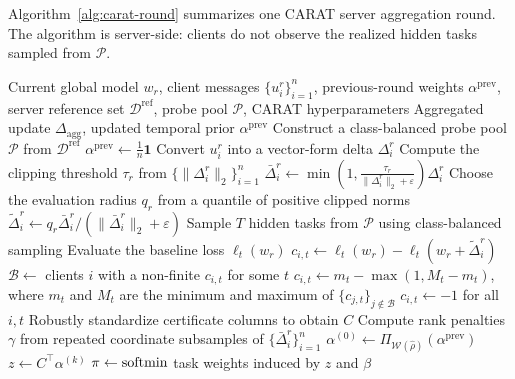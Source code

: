 Algorithm~\ref{alg:carat-round} summarizes one CARAT server aggregation round. The algorithm is server-side: clients do not observe the realized hidden tasks sampled from $\mathcal{P}$.

\begin{algorithm}[t]
\caption{CARAT server aggregation at round $r$}
\label{alg:carat-round}
\begin{algorithmic}[1]
\REQUIRE Current global model $w_r$, client messages $\{u_i^r\}_{i=1}^n$, previous-round weights $\alpha^{\mathrm{prev}}$, server reference set $\mathcal{D}^{\mathrm{ref}}$, probe pool $\mathcal{P}$, CARAT hyperparameters
\ENSURE Aggregated update $\Delta_{\mathrm{agg}}$, updated temporal prior $\alpha^{\mathrm{prev}}$
    \STATE Construct a class-balanced probe pool $\mathcal{P}$ from $\mathcal{D}^{\mathrm{ref}}$
\ENDIF
{}
    \STATE $\alpha^{\mathrm{prev}} \leftarrow \frac{1}{n}\mathbf{1}$
\ENDIF
{}
    \STATE Convert $u_i^r$ into a vector-form delta $\Delta_i^r$
\ENDFOR
\STATE Compute the clipping threshold $\tau_r$ from $\{\|\Delta_i^r\|_2\}_{i=1}^n$
    \STATE $\bar{\Delta}_i^r \leftarrow \min\!\left(1,\frac{\tau_r}{\|\Delta_i^r\|_2+\varepsilon}\right)\Delta_i^r$
\ENDFOR
\STATE Choose the evaluation radius $q_r$ from a quantile of positive clipped norms
    \STATE $\tilde{\Delta}_i^r \leftarrow q_r \bar{\Delta}_i^r / (\|\bar{\Delta}_i^r\|_2+\varepsilon)$
\ENDFOR
\STATE Sample $T$ hidden tasks from $\mathcal{P}$ using class-balanced sampling
    \STATE Evaluate the baseline loss $\ell_t(w_r)$
\ENDFOR
{}
        \STATE $c_{i,t} \leftarrow \ell_t(w_r) - \ell_t(w_r + \tilde{\Delta}_i^r)$
    \ENDFOR
\ENDFOR
\STATE $\mathcal{B} \leftarrow$ clients $i$ with a non-finite $c_{i,t}$ for some $t$
    \STATE $c_{i,t} \leftarrow m_t - \max(1, M_t - m_t)$, where $m_t$ and $M_t$ are the minimum and maximum of $\{c_{j,t}\}_{j\notin\mathcal{B}}$
\ENDFOR
\ELSE
    \STATE $c_{i,t} \leftarrow -1$ for all $i,t$ 
\ENDIF
\STATE Robustly standardize certificate columns to obtain $C$
\STATE Compute rank penalties $\gamma$ from repeated coordinate subsamples of $\{\bar{\Delta}_i^r\}_{i=1}^n$
\STATE $\alpha^{(0)} \leftarrow \Pi_{\mathcal{W}(\hat{\rho})}(\alpha^{\mathrm{prev}})$
    \STATE $z \leftarrow C^\top \alpha^{(k)}$
    \STATE $\pi \leftarrow \operatorname*{softmin}$ task weights induced by $z$ and $\beta$

\end{algorithmic}
\end{algorithm}
